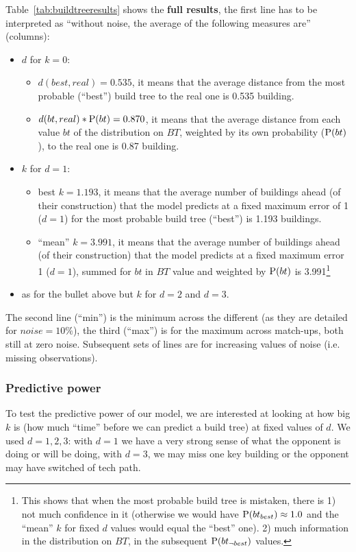 Table~\ref{tab:buildtreeresults} shows the \textbf{full results}, the first line has to be interpreted as ``without noise, the average of the following measures are'' (columns):
\begin{itemize}
    \item $d$ for $k=0$:
        \begin{itemize}
            \item $d(best,real) = 0.535$, it means that the average distance from the most probable (``best'') build tree to the real one is 0.535 building.
            \item $d(bt,real)*\mathrm{P}(bt) = 0.870$, it means that the average distance from each value $bt$ of the distribution on $BT$, weighted by its own probability ($\mathrm{P}(bt)$), to the real one is 0.87 building.
        \end{itemize}
    \item $k$ for $d=1$:
        \begin{itemize}
            \item best $k=1.193$, it means that the average number of buildings ahead (of their construction) that the model predicts at a fixed maximum error of 1 ($d=1$) for the most probable build tree (``best'') is 1.193 buildings.
            \item ``mean'' $k=3.991$, it means that the average number of buildings ahead (of their construction) that the model predicts at a fixed maximum error 1 ($d=1$), summed for $bt$ in $BT$ value and weighted by $\mathrm{P}(bt)$ is 3.991\footnote{This shows that when the most probable build tree is mistaken, there is 1) not much confidence in it (otherwise we would have $\mathrm{P}(bt_{best}) \approx 1.0$ and the ``mean'' $k$ for fixed $d$ values would equal the ``best'' one). 2) much information in the distribution on $BT$, in the subsequent $\mathrm{P}(bt_{\neg best})$ values.}
        \end{itemize}
    \item as for the bullet above but $k$ for $d=2$ and $d=3$.
\end{itemize}
The second line (``min'') is the minimum across the different  (as they are detailed for $noise=10\%$), the third (``max'') is for the maximum across match-ups, both still at zero noise. Subsequent sets of lines are for increasing values of noise (i.e. missing observations).

\subsubsection{Predictive power}
To test the predictive power of our model, we are interested at looking at how big $k$ is (how much ``time'' before we can predict a build tree) at fixed values of $d$. We used $d=1,2,3$: with $d=1$ we have a very strong sense of what the opponent is doing or will be doing, with $d=3$, we may miss one key building or the opponent may have switched of tech path. 

